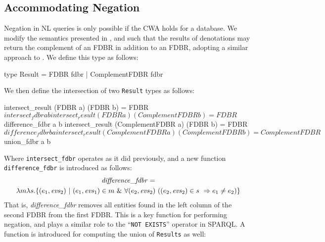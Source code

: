 \documentclass[../main.tex]{subfiles}
\begin{document}
\begin{refsection}
%
%

\section{Accommodating Negation}
\label{sec:negation}
\noindent Negation in NL queries is only possible if the CWA holds for a database.  We modify
the semantics presented in \cite{frostpeelar2019}, \cite{frost2018extensible} and \cite{peelar2020compositional} such that the results of denotations may return the complement of an FDBR in addition to an FDBR, adopting a similar approach to \cite{frostboulos2002}.  We define this type as follows:
\begin{code}
    type Result = FDBR fdbr | ComplementFDBR fdbr
\end{code}
We then define the intersection of two \texttt{Result} types as follows:
\begin{code}
    intersect_result (FDBR a) (FDBR b)
      = FDBR $ intersect_fdbr a b
    intersect_result (FDBR a) (ComplementFDBR b)
      = FDBR $ difference_fdbr a b
    intersect_result (ComplementFDBR a) (FDBR b)
      = FDBR $ difference_fdbr b a
    intersect_result (ComplementFDBR a) (ComplementFDBR b)
      = ComplementFDBR $ union_fdbr a b
\end{code}
Where \texttt{intersect\_fdbr} operates as it did previously, and a new function \linebreak \texttt{difference\_fdbr} is introduced as follows:
\begin{multline*}
\opit{difference\_fdbr} = \\ \lambda m \lambda s.\{(e_1,\evs_2)\ |\ (e_1,\evs_1) \in m\ \&\ \forall(e_2, \evs_2)\ ((e_2,\evs_2) \in s\ \Rightarrow e_1 \neq e_2)\}
\end{multline*}
That is, \textit{difference\_fdbr} removes all entities found in the left column of the second FDBR from the first FDBR.  This is a key function for performing negation, and plays a similar role to the ``\texttt{NOT EXISTS}'' operator in SPARQL.  A function is introduced for computing the union of \texttt{Results} as well:

\end{refsection}
\end{document}
